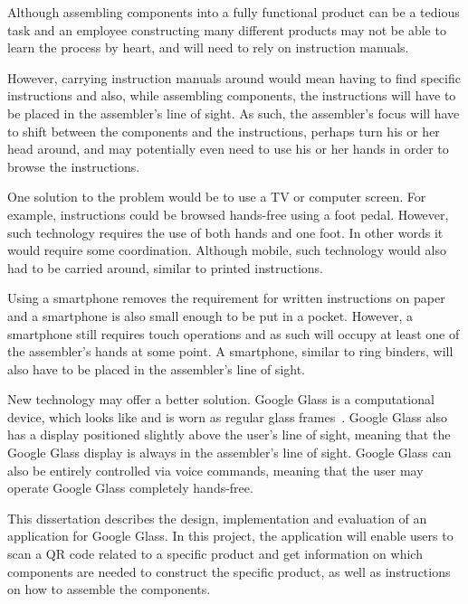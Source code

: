 %
%
%
%
%

Although assembling components into a fully functional product can be a tedious task and an employee constructing many different products may not be able to learn the process by heart, and will need to rely on instruction manuals.

However, carrying instruction manuals around would mean having to find specific instructions and also, while assembling components, the instructions will have to be placed in the assembler's line of sight. As such, the assembler's focus will have to shift between the components and the instructions, perhaps turn his or her head around, and may potentially even need to use his or her hands in order to browse the instructions. 

One solution to the problem would be to use a TV or computer screen. For example, instructions could be browsed hands-free using a foot pedal. However, such technology requires the use of both hands and one foot. In other words it would require some coordination. Although mobile, such technology would also had to be carried around, similar to printed instructions.

Using a smartphone removes the requirement for written instructions on paper and a smartphone is also small enough to be put in a pocket. However, a smartphone still requires touch operations and as such will occupy at least one of the assembler's hands at some point. A smartphone, similar to ring binders, will also have to be placed in the assembler's line of sight.

New technology may offer a better solution. Google Glass is a computational device, which looks like and is worn as regular glass frames~\cite{glassStart}. Google Glass also has a display positioned slightly above the user's line of sight, meaning that the Google Glass display is always in the assembler's line of sight. Google Glass can also be entirely controlled via voice commands, meaning that the user may operate Google Glass completely hands-free.

This dissertation describes the design, implementation and evaluation of an application for Google Glass. In this project, the application will enable users to scan a QR code related to a specific product and get information on which components are needed to construct the specific product, as well as instructions on how to assemble the components.

